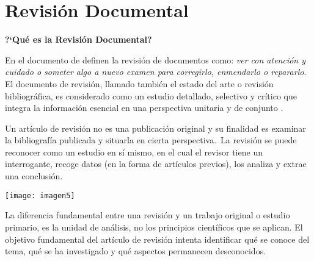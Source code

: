 
\setchapterpreamble[u]{\margintoc}

\chapter{Revisi\'on Documental}
\label{ch:def-RD}


\textbf{ ?`Qu\'e es la Revisi\'on Documental?}


En el documento  de \GU definen la revisión de documentos como: \textit{ver con atención y cuidado o someter algo a nuevo examen para corregirlo, enmendarlo o repararlo}. El documento de revisión, llamado también el estado del arte o revisión bibliográfica,  es considerado como un estudio detallado, selectivo y crítico que integra la información esencial en una perspectiva unitaria y de conjunto . 


 Un artículo de revisión no es una publicación original y su finalidad es examinar la bibliografía publicada y situarla en cierta perspectiva. La revisión se puede reconocer como un estudio en sí mismo, en el cual el revisor tiene un interrogante, recoge datos (en la forma de artículos previos), los analiza y extrae una conclusión.
 
 \begin{marginfigure}[-1cm]%
 	\texttt{[image: imagen5]}
 \end{marginfigure}



 
 La diferencia fundamental entre una revisión y un trabajo original o estudio primario, es la unidad de análisis, no los principios científicos que se aplican. El objetivo fundamental del artículo de revisión intenta identificar qué se conoce del tema, qué se ha investigado y qué aspectos permanecen desconocidos.
 
